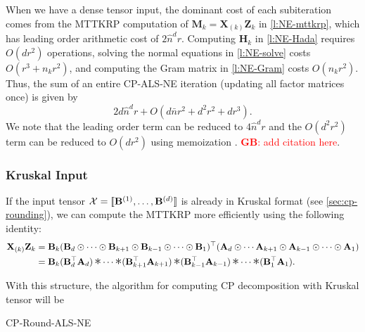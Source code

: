\documentclass{article}
\newcommand{\mat}[1]{\mathbf{#1}}
\newcommand{\T}[2][]{#1{\mathbf{\cal{#2}}}} 						%
\DeclareMathOperator*{\hada}{\scalebox{1.5}{$\ast$}}
\newcommand{\GB}[1]{\textcolor{red}{\textbf{GB}: #1}}
\begin{document}
When we have a dense tensor input, the dominant cost of each subiteration comes from the MTTKRP computation of $\mat{M}_k = \mat{X}_{(k)}\mat{Z}_k$ in \cref{l:NE-mttkrp}, which has leading order arithmetic cost of $2\hat n^dr$.
Computing $\mat{H}_k$ in \cref{l:NE-Hada} requires $O(dr^2)$ operations, solving the normal equations in \cref{l:NE-solve} costs $O(r^3+n_kr^2)$, and computing the Gram matrix in \cref{l:NE-Gram} costs $O(n_kr^2)$.
Thus, the sum of an entire CP-ALS-NE iteration (updating all factor matrices once) is given by
\begin{equation*}
2d\hat n^dr + O(d\bar n r^2 + d^2r^2 + dr^3).
\end{equation*}
We note that the leading order term can be reduced to $4\hat n^d r$ and the $O(d^2r^2)$ term can be reduced to $O(dr^2)$ using memoization \cite{phan2013fast}. \GB{add citation here}.

\subsubsection{Kruskal Input}
If the input tensor $\T{X}=[\![\mat{B}^{(1)}, \dots ,\mat{B}^{(d)}]\!]$ is already in Kruskal format (see \cref{sec:cp-rounding}), we can compute the MTTKRP more efficiently using the following identity:
\begin{align*}
  \mat{X}_{(k)}\mat{Z}_k &= \mat{B}_k(\mat{B}_d \odot \dots \odot \mat{B}_{k+1} \odot \mat{B}_{k-1} \odot \dots \odot \mat{B}_1)^\top(\mat{A}_d \odot \cdots \mat{A}_{k+1} \odot \mat{A}_{k-1} \odot \cdots \odot \mat{A}_1) \\
 &= \mat{B}_k(\mat{B}_d^\top\mat{A}_d) \hada \cdots \hada (\mat{B}_{k+1}^\top\mat{A}_{k+1}) \hada (\mat{B}_{k-1}^\top\mat{A}_{k-1}) \hada \cdots \hada (\mat{B}_1^\top\mat{A}_1).  
\end{align*}

With this structure, the algorithm for computing CP decomposition with Kruskal tensor will be  
\begin{algorithm}[!ht]
  \caption{CP-Round-ALS-NE}
  \label{alg:cp-als-ne-k}
  
  
\end{algorithm}

\end{document}
